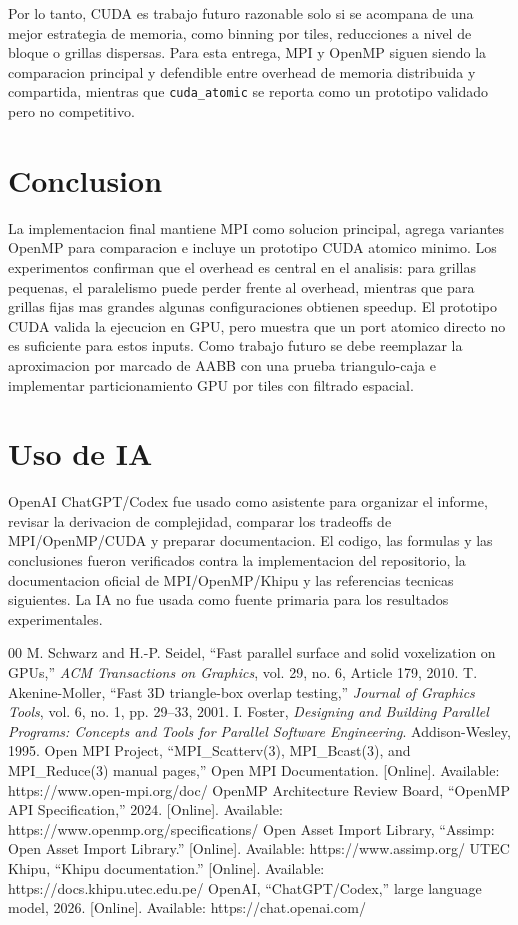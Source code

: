 \documentclass[conference]{IEEEtran}
\begin{document}
Por lo tanto, CUDA es trabajo futuro razonable solo si se acompana de una mejor
estrategia de memoria, como binning por tiles, reducciones a nivel de bloque o
grillas dispersas. Para esta entrega, MPI y OpenMP siguen siendo la comparacion
principal y defendible entre overhead de memoria distribuida y compartida,
mientras que \texttt{cuda\_atomic} se reporta como un prototipo validado pero no
competitivo.

\section{Conclusion}

La implementacion final mantiene MPI como solucion principal, agrega variantes
OpenMP para comparacion e incluye un prototipo CUDA atomico minimo. Los
experimentos confirman que el overhead es central en el analisis: para grillas
pequenas, el paralelismo puede perder frente al overhead, mientras que para
grillas fijas mas grandes algunas configuraciones obtienen speedup. El prototipo
CUDA valida la ejecucion en GPU, pero muestra que un port atomico directo no es
suficiente para estos inputs. Como trabajo futuro se debe reemplazar la
aproximacion por marcado de AABB con una prueba triangulo-caja e implementar
particionamiento GPU por tiles con filtrado espacial.

\section*{Uso de IA}

OpenAI ChatGPT/Codex fue usado como asistente para organizar el informe, revisar
la derivacion de complejidad, comparar los tradeoffs de MPI/OpenMP/CUDA y
preparar documentacion. El codigo, las formulas y las conclusiones fueron
verificados contra la implementacion del repositorio, la documentacion oficial
de MPI/OpenMP/Khipu y las referencias tecnicas siguientes. La IA no fue usada
como fuente primaria para los resultados experimentales.

\begin{thebibliography}{00}
     M. Schwarz and H.-P. Seidel, ``Fast parallel surface and solid voxelization on GPUs,'' \textit{ACM Transactions on Graphics}, vol. 29, no. 6, Article 179, 2010.
     T. Akenine-Moller, ``Fast 3D triangle-box overlap testing,'' \textit{Journal of Graphics Tools}, vol. 6, no. 1, pp. 29--33, 2001.
     I. Foster, \textit{Designing and Building Parallel Programs: Concepts and Tools for Parallel Software Engineering}. Addison-Wesley, 1995.
     Open MPI Project, ``MPI\_Scatterv(3), MPI\_Bcast(3), and MPI\_Reduce(3) manual pages,'' Open MPI Documentation. [Online]. Available: https://www.open-mpi.org/doc/
     OpenMP Architecture Review Board, ``OpenMP API Specification,'' 2024. [Online]. Available: https://www.openmp.org/specifications/
     Open Asset Import Library, ``Assimp: Open Asset Import Library.'' [Online]. Available: https://www.assimp.org/
     UTEC Khipu, ``Khipu documentation.'' [Online]. Available: https://docs.khipu.utec.edu.pe/
     OpenAI, ``ChatGPT/Codex,'' large language model, 2026. [Online]. Available: https://chat.openai.com/
\end{thebibliography}
\end{document}

